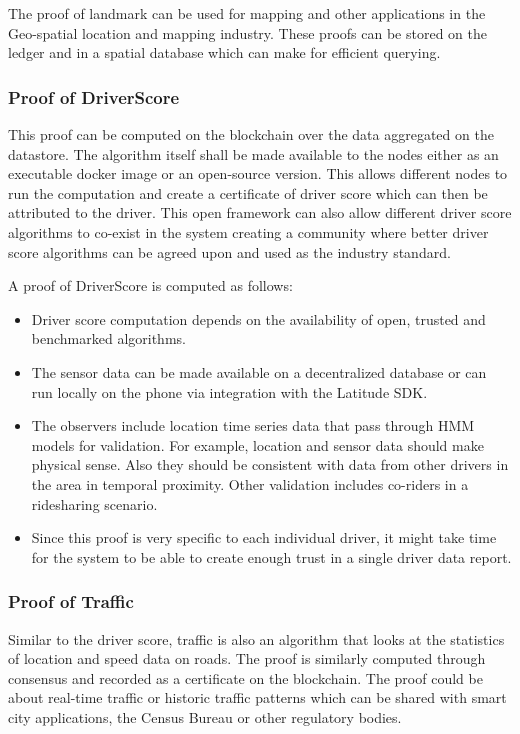 The proof of landmark can be used for mapping and other applications in the Geo-spatial location and mapping industry.
These proofs can be stored on the ledger and in a spatial database which can make for efficient querying.

\subsubsection{Proof of DriverScore}

This proof can be computed on the blockchain over the data aggregated on the
datastore. The algorithm itself shall be made available to the nodes either as an executable docker image or an
open-source version. This allows different nodes to run the computation and create a certificate of driver score which
can then be attributed to the driver. This open framework can also allow different driver score algorithms to co-exist
in the system creating a community where better driver score algorithms can be agreed upon and used as the industry
standard.

A proof of DriverScore is computed as follows:
\begin{itemize}
    \item Driver score computation depends on the availability of open, trusted and benchmarked algorithms.
    \item The sensor data can be made available on a decentralized database or can run locally on the phone via
        integration with the Latitude SDK.
    \item The observers include location time series data that pass through HMM models for validation. For example,
        location and sensor data should make physical sense. Also they should be consistent with data from other
        drivers in the area in temporal proximity. Other validation includes co-riders in a ridesharing scenario. 
    \item Since this proof is very specific to each individual driver, it might take time for the system to be able to
        create enough trust in a single driver data report.
\end{itemize}

\subsubsection{Proof of Traffic}

Similar to the driver score, traffic is also an algorithm that looks at the statistics
of location and speed data on roads. The proof is similarly computed through consensus and recorded as a certificate on
the blockchain. The proof could be about real-time traffic or historic traffic patterns which can be shared with smart
city applications, the Census Bureau or other regulatory bodies.

